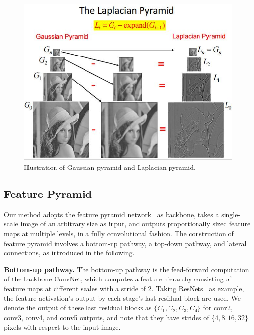 \documentclass{article} %
\begin{document}
\begin{figure}
    \centering
    \includegraphics[width=\textwidth]{the-laplacian-pyramid.jpg}
    \caption{Illustration of Gaussian pyramid and Laplacian pyramid.~\cite{pyramid}}
    \label{fig2}
\end{figure}

\subsection{Feature Pyramid}
Our method adopts the feature pyramid network~\cite{lin2017feature} as backbone, takes a single-scale image of an arbitrary size as input, and outputs proportionally sized feature maps at multiple levels, in a fully convolutional fashion. The construction of feature pyramid involves a bottom-up pathway, a top-down pathway, and lateral connections, as introduced in the following.

\textbf{Bottom-up pathway.} The bottom-up pathway is the feed-forward computation of the backbone ConvNet, which computes a feature hierarchy consisting of feature maps at different scales with a stride of 2. Taking ResNets~\cite{he2016deep} as example, the feature activation's output by each stage’s last residual block are used. We denote the output of these last residual blocks as $\{C_1, C_2, C_3, C_4\}$ for conv2, conv3, conv4, and conv5 outputs, and note that they have strides of $\{4, 8, 16, 32\}$ pixels with respect to the input image.
\end{document}
